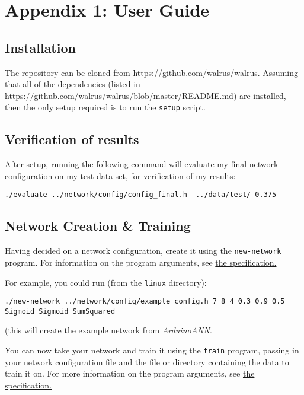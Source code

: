 \documentclass[a4paper]{article}
\begin{document}
\newpage
\section{Appendix 1: User Guide}
\label{sec:a1}

\subsection{Installation}%
\label{subsec:a1_installation}

The repository can be cloned from \url{https://github.com/walrus/walrus}. Assuming that all of the dependencies (listed in \url{https://github.com/walrus/walrus/blob/master/README.md}) are installed, then the only setup required is to run the \lstinline{setup} script.

\subsection{Verification of results}%

After setup, running the following command will evaluate my final network configuration on my test data set, for verification of my results:

\lstinline{./evaluate ../network/config/config_final.h  ../data/test/ 0.375}

\subsection{Network Creation \& Training}%
\label{subsec:a1_training}

Having decided on a network configuration, create it using the \lstinline{new-network} program. For information on the program arguments, see \hyperref[subsubsec:dc_csa_newnetwork]{the specification.}

For example, you could run (from the \lstinline{linux} directory):

\lstinline{./new-network ../network/config/example_config.h 7 8 4 0.3 0.9 0.5 Sigmoid Sigmoid SumSquared}

(this will create the example network from \textit{ArduinoANN}.

You can now take your network and train it using the \lstinline{train} program, passing in your network configuration file and the file or directory containing the data to train it on. For more information on the program arguments, see \hyperref[subsubsec:dc_csa_train]{the specification.}
\end{document}
